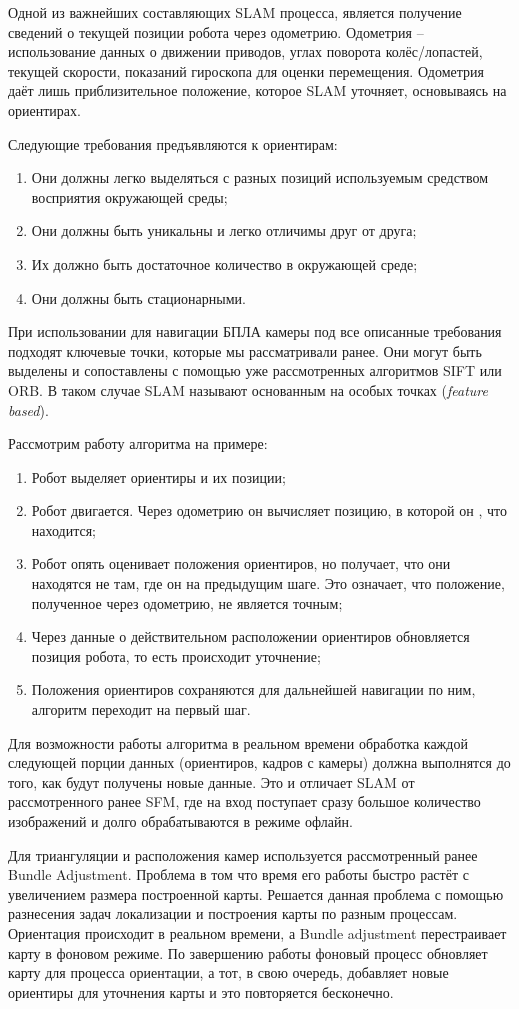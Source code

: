 Одной из важнейших составляющих SLAM процесса, является получение сведений о текущей позиции робота через одометрию. Одометрия -- использование данных о движении приводов, углах поворота колёс/лопастей, текущей скорости, показаний гироскопа для оценки перемещения. Одометрия даёт лишь приблизительное положение, которое SLAM уточняет, основываясь на ориентирах.

Следующие требования предъявляются к ориентирам:
\begin{enumerate}
    \item Они должны легко выделяться с разных позиций используемым средством восприятия окружающей среды;
    \item Они должны быть уникальны и легко отличимы друг от друга;
    \item Их должно быть достаточное количество в окружающей среде;
    \item Они должны быть стационарными.
\end{enumerate}

При использовании для навигации БПЛА камеры под все описанные требования подходят ключевые точки, которые мы рассматривали ранее. Они могут быть выделены и сопоставлены с помощью уже рассмотренных алгоритмов SIFT или ORB. В таком случае SLAM называют основанным на особых точках (\textit{feature based}).

Рассмотрим работу алгоритма на примере:
\begin{enumerate}
    \item Робот выделяет ориентиры и их позиции;
    \item Робот двигается. Через одометрию он вычисляет позицию, в которой он , что находится;
    \item Робот опять оценивает положения ориентиров, но получает, что они находятся не там, где он  на предыдущим шаге. Это означает, что положение, полученное через одометрию, не является точным;
    \item Через данные о действительном расположении ориентиров обновляется позиция робота, то есть происходит уточнение;
    \item Положения ориентиров сохраняются для дальнейшей навигации по ним, алгоритм переходит на первый шаг.
\end{enumerate}

Для возможности работы алгоритма в реальном времени обработка каждой следующей порции данных (ориентиров, кадров с камеры) должна выполнятся до того, как будут получены новые данные. Это и отличает SLAM от рассмотренного ранее SFM, где на вход поступает сразу большое количество изображений и долго обрабатываются в режиме офлайн.

Для триангуляции и расположения камер используется рассмотренный ранее Bundle Adjustment. Проблема в том что время его работы быстро растёт с увеличением размера построенной карты. Решается данная проблема с помощью разнесения задач локализации и построения карты по разным процессам. Ориентация происходит в реальном времени, а Bundle adjustment перестраивает карту в фоновом режиме. По завершению работы фоновый процесс обновляет карту для процесса ориентации, а тот, в свою очередь, добавляет новые ориентиры для уточнения карты и это повторяется бесконечно.
